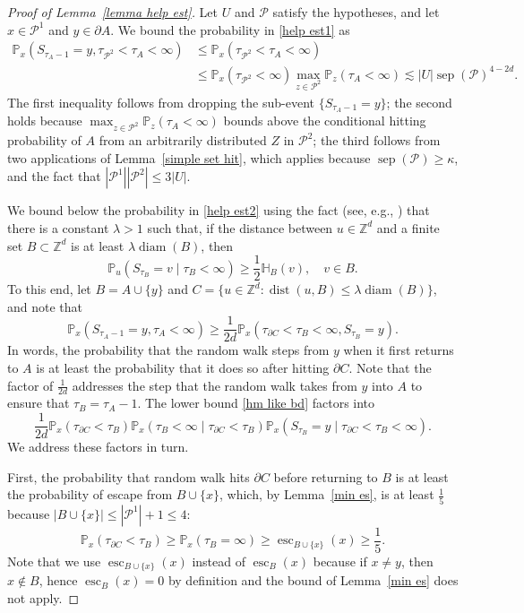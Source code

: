 \documentclass[11pt,reqno]{amsart}
\theoremstyle{definition}
\numberwithin{equation}{section}
\newcommand{\Z}{\mathbb{Z}}
\renewcommand{\P}{\mathbb{P}}
\newcommand{\1}{\mathbf{1}}
\renewcommand{\H}{\mathbb{H}}
\newcommand{\bdy}{\partial}
\DeclareMathOperator{\dist}{dist}
\DeclareMathOperator{\diam}{diam}
\DeclareMathOperator{\sep}{sep}
\DeclareMathOperator{\Es}{esc}
\begin{document}
\begin{proof}[Proof of Lemma~\ref{lemma help est}]
Let $U$ and $\mathcal{P}$ satisfy the hypotheses, and let $x \in \mathcal{P}^1$ and $y \in \bdy A$. We bound the probability in \eqref{help est1} as
\begin{align*}
\P_{x} (S_{\tau_A - 1} = y, \tau_{\mathcal{P}^2} < \tau_A < \infty)
&\leq \P_x (\tau_{\mathcal{P}^2} < \tau_A < \infty)\\ 
&\leq \P_x (\tau_{\mathcal{P}^2} < \infty) \max_{z \in \mathcal{P}^2} \P_z ( \tau_A < \infty) \lesssim |U| \sep (\mathcal{P})^{4-2d}.
\end{align*}
The first inequality follows from dropping the sub-event $\{S_{\tau_A-1} = y\}$; the second holds because $\max_{z \in \mathcal{P}^2} \P_z (\tau_A < \infty)$ bounds above the conditional hitting probability of $A$ from an arbitrarily distributed $Z$ in $\mathcal{P}^2$; the third follows from two applications of Lemma~\ref{simple set hit}, which applies because $\sep (\mathcal{P}) \geq \kappa$, and the fact that $|\mathcal{P}^1| |\mathcal{P}^2| \leq 3 |U|$.

We bound below the probability in \eqref{help est2} using the fact (see, e.g., \cite[Exercise 3.25]{popov2021}) that there is a constant $\lambda > 1$ such that, if the distance between $u \in \Z^d$ and a finite set $B \subset \Z^d$ is at least $\lambda \diam (B)$, then 
\begin{equation}\label{ex325}
\P_u (S_{\tau_B} = v \mid \tau_B < \infty) \geq \frac12 \H_B (v), \quad v \in B.
\end{equation}
To this end, let $B = A \cup \{y\}$ and $C = \{u \in \Z^d: \dist (u, B) \leq \lambda \diam (B)\}$, and note that
\begin{equation}\label{hm like bd}
\P_x (S_{\tau_A - 1} = y, \tau_A < \infty) \geq \frac{1}{2d} \P_x (\tau_{\bdy C} < \tau_B < \infty, S_{\tau_B} = y).
\end{equation}
In words, the probability that the random walk steps from $y$ when it first returns to $A$ is at least the probability that it does so after hitting $\bdy C$. Note that the factor of $\frac{1}{2d}$ addresses the step that the random walk takes from $y$ into $A$ to ensure that $\tau_B = \tau_A - 1$.  
The lower bound \eqref{hm like bd} factors into
\[
\frac{1}{2d} \P_x (\tau_{\bdy C} < \tau_B) \P_x (\tau_B < \infty \mid \tau_{\bdy C} < \tau_B) \P_x (S_{\tau_B} = y \mid \tau_{\bdy C} < \tau_B < \infty).
\]
We address these factors in turn.

First, the probability that random walk hits $\bdy C$ before returning to $B$ is at least the probability of escape from $B \cup \{x\}$, which, by Lemma~\ref{min es}, is at least $\frac{1}{5}$ because $|B \cup \{x\}| \leq |\mathcal{P}^1| + 1 \leq 4$:
\[
\P_x (\tau_{\bdy C} < \tau_B ) \geq \P_x (\tau_B = \infty) \geq \Es_{B \cup \{x\}} (x) \geq \frac15.
\]
Note that we use $\Es_{B \cup \{x\}} (x)$ instead of $\Es_B (x)$ because if $x \neq y$, then $x \notin B$, hence $\Es_B (x) = 0$ by definition and the bound of Lemma~\ref{min es} does not apply. 


\end{proof}
\end{document}
